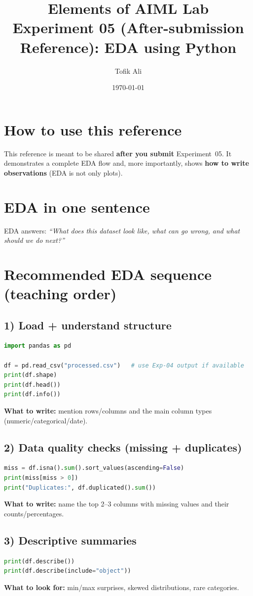 \documentclass[11pt]{article}
\title{Elements of AIML Lab\\Experiment 05 (After-submission Reference): EDA using Python}
\author{Tofik Ali}
\date{\today}
\begin{document}
\maketitle
\tableofcontents

\section{How to use this reference}
This reference is meant to be shared \textbf{after you submit} Experiment~05.
It demonstrates a complete EDA flow and, more importantly, shows \textbf{how to write observations} (EDA is not only plots).

\section{EDA in one sentence}
EDA answers: \emph{``What does this dataset look like, what can go wrong, and what should we do next?''}

\section{Recommended EDA sequence (teaching order)}
\subsection{1) Load + understand structure}
\begin{lstlisting}[language=Python]
import pandas as pd

df = pd.read_csv("processed.csv")   # use Exp-04 output if available
print(df.shape)
print(df.head())
print(df.info())
\end{lstlisting}
\textbf{What to write:} mention rows/columns and the main column types (numeric/categorical/date).

\subsection{2) Data quality checks (missing + duplicates)}
\begin{lstlisting}[language=Python]
miss = df.isna().sum().sort_values(ascending=False)
print(miss[miss > 0])
print("Duplicates:", df.duplicated().sum())
\end{lstlisting}
\textbf{What to write:} name the top 2--3 columns with missing values and their counts/percentages.

\subsection{3) Descriptive summaries}
\begin{lstlisting}[language=Python]
print(df.describe())
print(df.describe(include="object"))
\end{lstlisting}
\textbf{What to look for:} min/max surprises, skewed distributions, rare categories.
\end{document}
